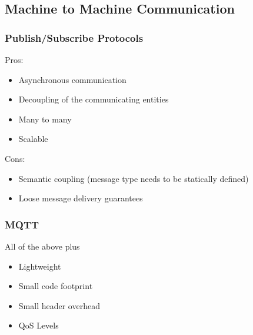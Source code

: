 \subsection{Machine to Machine Communication}


\begin{frame}
\frametitle{Publish/Subscribe Protocols}
Pros:

\begin{itemize}
\item Asynchronous communication
\item Decoupling of the communicating entities
\item Many to many
\item Scalable
\end{itemize}

Cons:
\begin{itemize}
\item Semantic coupling (message type needs to be statically defined)
\item Loose message delivery guarantees
\end{itemize}

\end{frame}


\begin{frame}
\frametitle{MQTT}

All of the above plus
\begin{itemize}
\item Lightweight
\item Small code footprint
\item Small header overhead
\item QoS Levels
\end{itemize}

\begin{figure}[!htb]
\centering
{}
\end{figure}

\end{frame}
